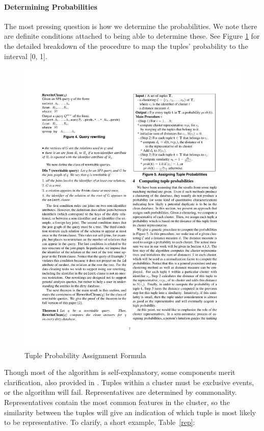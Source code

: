 \paragraph{Determining Probabilities}
The most pressing question is how we determine the probabilities. We note there are definite conditions attached to being able to determine these. See Figure \ref{formula} for the detailed breakdown of the procedure to map the tuples' probability to the interval [0, 1].

\begin{figure}[!h]
  \centering \includegraphics{images/formula.pdf}
  \caption[Tuple Probability Assignment Formula]{Tuple Probability Assignment Formula \cite{CA}}
  \label{formula}
\end{figure}

Though most of the algorithm is self-explanatory, some components merit clarification, also provided in \cite{CA}. Tuples within a cluster must be exclusive events, or the algorithm will fail. Representatives are determined by commonality. Representatives contain the most common features in the cluster, so the similarity between the tuples will give an indication of which tuple is most likely to be representative. To clarify, a short example, Table~\ref{rep}:


